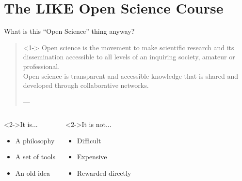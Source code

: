 \section[The course]{The LIKE Open Science Course}
\label{sec:course}

\begin{frame}{What is this ``Open Science'' thing anyway?}

\begin{quotation}<1->
Open science is the movement to make scientific research and its dissemination accessible to all levels of an inquiring society, amateur or professional. \\
Open science is transparent and accessible knowledge that is shared and developed through collaborative networks.
\begin{flushright}
    \tiny{---}
  \end{flushright}
\end{quotation}

\begin{columns}
        \begin{block}<2->{It is...}
            \begin{itemize}
                \item A philosophy
                \item A set of tools
                \item An old idea
            \end{itemize}
        \end{block}
    
        \begin{block}<2->{It is not...}
            \begin{itemize}
                \item Difficult
                \item Expensive
                \item Rewarded directly
            \end{itemize}
        \end{block}
    
\end{columns}

\end{frame}


